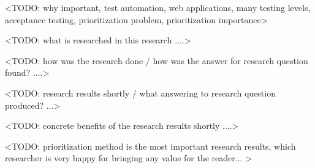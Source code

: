 <TODO: why important, test automation,  web applications,  many testing levels, acceptance testing, prioritization problem, prioritization importance>

<TODO: what is researched in this research ....>

<TODO: how was the research done / how was the answer for research question found? ....>

<TODO: research results shortly / what answering to research question produced? ...>

<TODO: concrete benefits of the research results shortly ....>

<TODO: prioritization method is the most important research results, which researcher is very happy for bringing any value for the reader... >